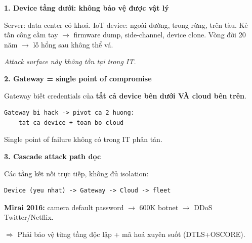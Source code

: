 \documentclass[9pt,a4paper,twocolumn]{article}
\begin{document}
\begin{tcolorbox}[deepbox, title={3 Điểm Yếu Kiến Trúc 4 Tầng (Security)}]

\textbf{1. Device tầng dưới: không bảo vệ được vật lý}

Server: data center có khoá. IoT device: ngoài đường, trong rừng, trên tàu.
Kẻ tấn công cầm tay $\rightarrow$ firmware dump, side-channel, device clone.
Vòng đời 20 năm $\rightarrow$ lỗ hổng sau không thể vá.

\textit{Attack surface này không tồn tại trong IT.}

\textbf{2. Gateway = single point of compromise}

Gateway biết credentials của \textbf{tất cả device bên dưới VÀ cloud bên trên}.
\begin{lstlisting}
Gateway bi hack -> pivot ca 2 huong:
    tat ca device + toan bo cloud
\end{lstlisting}
Single point of failure không có trong IT phân tán.

\textbf{3. Cascade attack path dọc}

Các tầng kết nối trực tiếp, không đủ isolation:
\begin{lstlisting}
Device (yeu nhat) -> Gateway -> Cloud -> fleet
\end{lstlisting}
\textbf{Mirai 2016:} camera default password $\rightarrow$ 600K botnet $\rightarrow$ DDoS Twitter/Netflix.

$\Rightarrow$ Phải bảo vệ từng tầng độc lập + mã hoá xuyên suốt (DTLS+OSCORE).

\end{tcolorbox}
\end{document}
